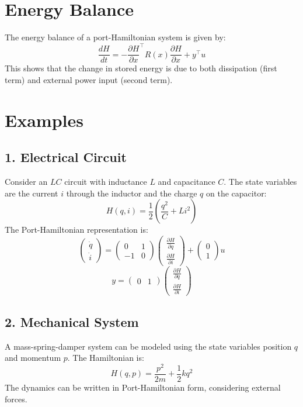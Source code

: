 \section{Energy Balance}
The energy balance of a port-Hamiltonian system is given by:
\[
\frac{dH}{dt} = -\frac{\partial H}{\partial x}^\top R(x) \frac{\partial H}{\partial x} + y^\top u
\]
This shows that the change in stored energy is due to both dissipation (first term) and external power input (second term).

\section{Examples}
\subsection{1. Electrical Circuit}
Consider an $LC$ circuit with inductance $L$ and capacitance $C$. The state variables are the current $i$ through the inductor and the charge $q$ on the capacitor:
\[
H(q, i) = \frac{1}{2} \left( \frac{q^2}{C} + L i^2 \right)
\]
The Port-Hamiltonian representation is:
\[
\begin{pmatrix} \dot{q} \\ \dot{i} \end{pmatrix} = \begin{pmatrix} 0 & 1 \\ -1 & 0 \end{pmatrix} \begin{pmatrix} \frac{\partial H}{\partial q} \\ \frac{\partial H}{\partial i} \end{pmatrix} + \begin{pmatrix} 0 \\ 1 \end{pmatrix} u
\]
\[
y = \begin{pmatrix} 0 & 1 \end{pmatrix} \begin{pmatrix} \frac{\partial H}{\partial q} \\ \frac{\partial H}{\partial i} \end{pmatrix}
\]

\subsection{2. Mechanical System}
A mass-spring-damper system can be modeled using the state variables position $q$ and momentum $p$. The Hamiltonian is:
\[
H(q, p) = \frac{p^2}{2m} + \frac{1}{2} k q^2
\]
The dynamics can be written in Port-Hamiltonian form, considering external forces.

